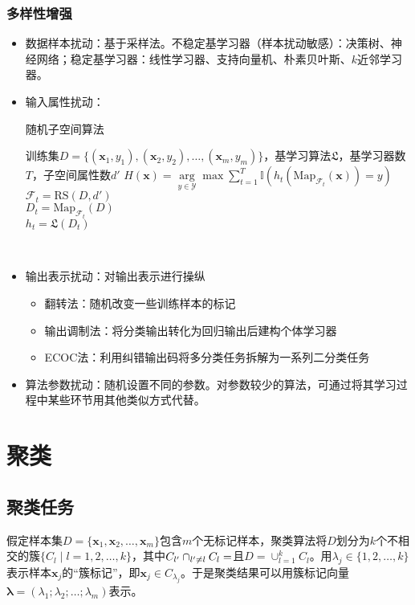 \documentclass{ctexart}
\begin{document}
 					\subsubsection{多样性增强}
 						\begin{itemize}
 							\item 数据样本扰动：基于采样法。不稳定基学习器（样本扰动敏感）：决策树、神经网络；稳定基学习器：线性学习器、支持向量机、朴素贝叶斯、$k$近邻学习器。
 							\item 输入属性扰动：\begin{algorithm}
 								\caption{随机子空间算法}
 								\begin{algorithmic}[1]
 									\REQUIRE 训练集$D=\{(\bm{x}_1,y_1),(\bm{x}_2,y_2),\dots,(\bm{x}_m,y_m)\}$，基学习算法$\mathfrak{L}$，基学习器数$T$，子空间属性数$d'$
 									\ENSURE $H(\bm{x})=\arg\limits_{y\in\mathcal{Y}}\max\sum_{t=1}^{T}\mathbb{I}(h_t(\mathrm{Map}_{\mathcal{F}_t}(\bm{x}))=y)$
 										\STATE $\mathcal{F}_t=\mathrm{RS}(D,d')$\\
 										\STATE $D_t=\mathrm{Map}_{\mathcal{F}_t}(D)$\\
 										\STATE $h_t=\mathfrak{L}(D_t)$\\
 									\ENDFOR
 								\end{algorithmic} 
 							\end{algorithm}
 							\item 输出表示扰动：对输出表示进行操纵\begin{itemize}
 								\item 翻转法：随机改变一些训练样本的标记
 								\item 输出调制法：将分类输出转化为回归输出后建构个体学习器
 								\item ECOC法：利用纠错输出码将多分类任务拆解为一系列二分类任务
 							\end{itemize}
 							\item 算法参数扰动：随机设置不同的参数。对参数较少的算法，可通过将其学习过程中某些环节用其他类似方式代替。
 						\end{itemize}
			\section{聚类}
				\subsection{聚类任务}
					
					假定样本集$D=\{\bm{x}_1,\bm{x}_2,\dots,\bm{x}_m\}$包含$m$个无标记样本，聚类算法将$D$划分为$k$个不相交的簇$\{C_l\mid l=1,2,\dots,k\}$，其中$C_{l'}\cap_{l'\neq l}C_l=\empty$且$D=\cup_{l=1}^kC_l$。用$\lambda_j\in\{1,2,\dots,k\}$表示样本$\bm{x}_j$的``簇标记''，即$\bm{x}_j\in C_{\lambda_j}$。于是聚类结果可以用簇标记向量$\bm{\lambda}=(\lambda_1;\lambda_2;\dots;\lambda_m)$表示。
\end{document}
